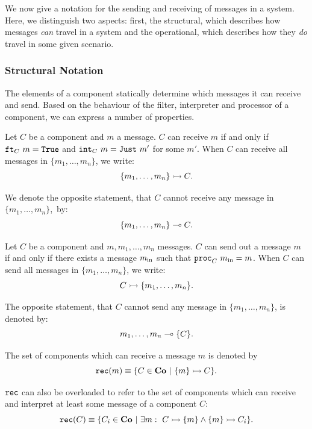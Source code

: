 We now give a notation for the sending and receiving of messages in a system. Here, we distinguish two aspects: first, the structural, which describes how messages {\em can} travel in a system and the operational, which describes how they {\em do} travel in some given scenario.

\subsubsection{Structural Notation}

The elements of a component statically determine which messages it can receive and send. Based on the behaviour of the filter, interpreter and processor of a component, we can express a number of properties.

\begin{definition}
	Let $C$ be a component and $m$ a message. $C$ can receive $m$ if and only if $\texttt{ft}_{C}\ m = \mathtt{True}$ and $\texttt{int}_{C}\ m = \mathtt{Just}\ m'$ for some $m'$.
	When $C$ can receive all messages in $\{m_1,\dots,m_n\}$, we write:
	$$
	\{m_1,\dots,m_n\} \rightarrowtail C.
	$$
	
	We denote the opposite statement, that $C$ cannot receive any message in $\{m_1,\dots,m_n\}$,~by:
	$$
	\{m_1,\dots,m_n\} \multimap C.
	$$
\end{definition}

\begin{definition}
	Let $C$ be a component and $m, m_1,\dots,m_n$ messages. $C$ can send out a message $m$ if and only if there exists a message $m_{\textnormal{in}}$ such that $\texttt{proc}_{C}\ m_{\textnormal{in}} = m$.
	When $C$ can send all messages in $\{m_1,\dots,m_n\}$, we write:
	$$
	C \rightarrowtail \{m_1,\dots,m_n\}.
	$$
	
	The opposite statement, that $C$ cannot send any message in $\{m_1,\dots,m_n\}$, is denoted by:
	$$
	m_1,\dots,m_n \multimap \{C\}.
	$$
\end{definition}

\begin{definition}
	The set of components which can receive a message $m$ is denoted by
	$$
	\rec{m} \equiv \{C \in \co\ |\ \canrec{m}{C} \}.
	$$
	
	$\mathtt{rec}$ can also be overloaded to refer to the set of components which can receive and interpret at least some message of a component $C$:
	$$
	\mathtt{rec}(C) \equiv \{C_i \in \mathbf{Co}\ |\ \exists m:\ C \rightarrowtail \{m\} \wedge \{m\} \rightarrowtail C_i \}.
	$$
\end{definition}


